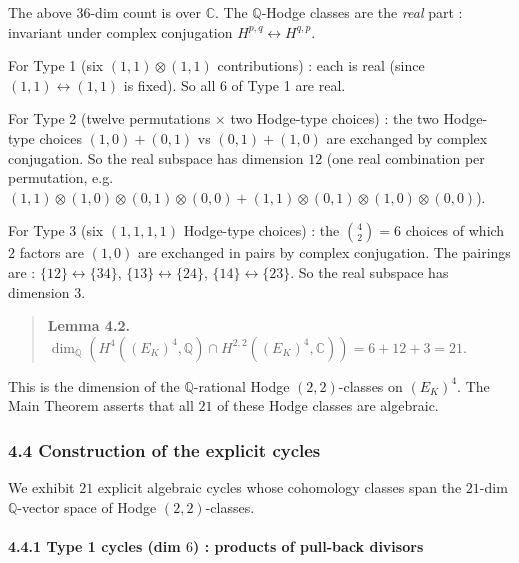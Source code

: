 \documentclass[
  11pt,
  a4paper,
]{amsart}
\begin{document}
The above \(36\)-dim count is over \(\mathbb{C}\). The \(\mathbb{Q}\)-Hodge classes are the \emph{real} part : invariant under complex conjugation \(H^{p,q} \leftrightarrow H^{q,p}\).

For Type 1 (six \((1,1) \otimes (1,1)\) contributions) : each is real (since \((1,1) \leftrightarrow (1,1)\) is fixed). So all \(6\) of Type 1 are real.

For Type 2 (twelve permutations × two Hodge-type choices) : the two Hodge-type choices \((1,0)+(0,1)\) vs \((0,1)+(1,0)\) are exchanged by complex conjugation. So the real subspace has dimension \(12\) (one real combination per permutation, e.g.~\((1,1) \otimes (1,0) \otimes (0,1) \otimes (0,0) + (1,1) \otimes (0,1) \otimes (1,0) \otimes (0,0)\)).

For Type 3 (six \((1,1,1,1)\) Hodge-type choices) : the \(\binom{4}{2} = 6\) choices of which \(2\) factors are \((1,0)\) are exchanged in pairs by complex conjugation. The pairings are : \(\{12\} \leftrightarrow \{34\}\), \(\{13\} \leftrightarrow \{24\}\), \(\{14\} \leftrightarrow \{23\}\). So the real subspace has dimension \(3\).

\begin{quote}
\textbf{Lemma 4.2.} \(\dim_\mathbb{Q} (H^4((E_K)^4, \mathbb{Q}) \cap H^{2,2}((E_K)^4, \mathbb{C})) = 6 + 12 + 3 = 21\).
\end{quote}

This is the dimension of the \(\mathbb{Q}\)-rational Hodge \((2,2)\)-classes on \((E_K)^4\). The Main Theorem asserts that all \(21\) of these Hodge classes are algebraic.

\hypertarget{construction-of-the-explicit-cycles}{%
\subsubsection{4.4 Construction of the explicit cycles}\label{construction-of-the-explicit-cycles}}

We exhibit \(21\) explicit algebraic cycles whose cohomology classes span the \(21\)-dim \(\mathbb{Q}\)-vector space of Hodge \((2,2)\)-classes.

\hypertarget{type-1-cycles-dim-6-products-of-pull-back-divisors}{%
\paragraph{\texorpdfstring{4.4.1 Type 1 cycles (dim \(6\)) : products of pull-back divisors}{4.4.1 Type 1 cycles (dim 6) : products of pull-back divisors}}\label{type-1-cycles-dim-6-products-of-pull-back-divisors}}
\end{document}
